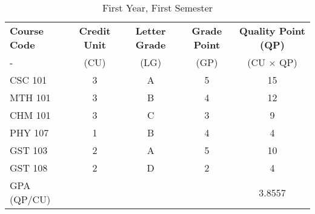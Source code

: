 \documentclass{article}
\begin{document}
	
	\begin{table}[h!]
		\begin{center}
			\caption{First Year, First Semester}
			\label{tab:table1}
			\begin{tabular}{l|c|c|c|c}
				\textbf{Course Code} & \textbf{Credit Unit} & \textbf{Letter Grade} & \textbf{Grade Point} &
				\textbf{Quality Point (QP)} \\
				- & (CU) & (LG) & (GP) & (CU $\times$ QP) \\
				\hline
				CSC 101 & 3 & A & 5 & 15 \\
				MTH 101 & 3 & B & 4 & 12 \\
				CHM 101 & 3 & C & 3 & 9\\
				PHY 107 & 1 & B & 4 & 4\\
				GST 103 & 2 & A & 5 & 10\\
				GST 108 & 2 & D & 2 & 4\\
				GPA (QP/CU) &&&& 3.8557
			\end{tabular}
		\end{center}
	\end{table}
\end{document}
